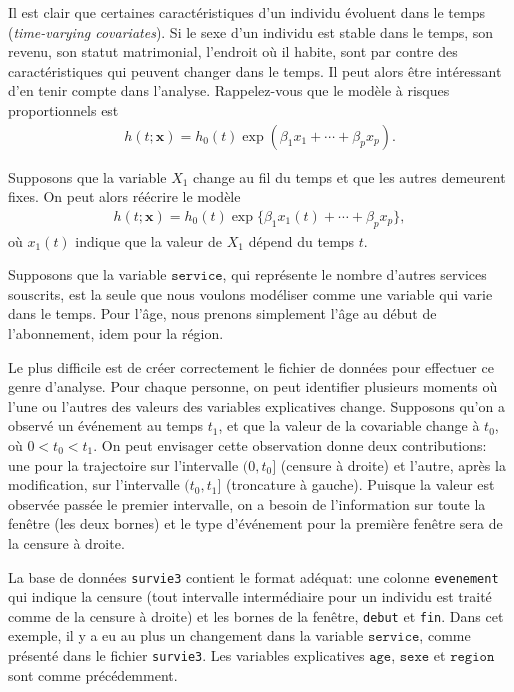 \documentclass[
  11pt,
  letterpaper,
]{book}
\theoremstyle{definition}
\theoremstyle{remark}
\begin{document}
Il est clair que certaines caractéristiques d'un individu évoluent dans
le temps (\emph{time-varying covariates}). Si le sexe d'un individu est
stable dans le temps, son revenu, son statut matrimonial, l'endroit où
il habite, sont par contre des caractéristiques qui peuvent changer dans
le temps. Il peut alors être intéressant d'en tenir compte dans
l'analyse. Rappelez-vous que le modèle à risques proportionnels est
\begin{align*}
h(t; \boldsymbol{x}) = h_0(t) \exp(\beta_1x_1 + \cdots + \beta_px_p).
\end{align*}

Supposons que la variable \(X_1\) change au fil du temps et que les
autres demeurent fixes. On peut alors réécrire le modèle \begin{align*}
h(t; \boldsymbol{x}) = h_0(t) \exp\{\beta_1x_1(t) + \cdots + \beta_px_p\},
\end{align*} où \(x_1(t)\) indique que la valeur de \(X_1\) dépend du
temps \(t\).

Supposons que la variable \(\texttt{service}\), qui représente le nombre
d'autres services souscrits, est la seule que nous voulons modéliser
comme une variable qui varie dans le temps. Pour l'âge, nous prenons
simplement l'âge au début de l'abonnement, idem pour la région.

Le plus difficile est de créer correctement le fichier de données pour
effectuer ce genre d'analyse. Pour chaque personne, on peut identifier
plusieurs moments où l'une ou l'autres des valeurs des variables
explicatives change. Supposons qu'on a observé un événement au temps
\(t_1\), et que la valeur de la covariable change à \(t_0\), où
\(0 < t_0 < t_1\). On peut envisager cette observation donne deux
contributions: une pour la trajectoire sur l'intervalle \((0, t_0]\)
(censure à droite) et l'autre, après la modification, sur l'intervalle
\((t_0, t_1]\) (troncature à gauche). Puisque la valeur est observée
passée le premier intervalle, on a besoin de l'information sur toute la
fenêtre (les deux bornes) et le type d'événement pour la première
fenêtre sera de la censure à droite.

La base de données \texttt{survie3} contient le format adéquat: une
colonne \texttt{evenement} qui indique la censure (tout intervalle
intermédiaire pour un individu est traité comme de la censure à droite)
et les bornes de la fenêtre, \texttt{debut} et \texttt{fin}. Dans cet
exemple, il y a eu au plus un changement dans la variable
\(\texttt{service}\), comme présenté dans le fichier \texttt{survie3}.
Les variables explicatives \(\texttt{age}\), \(\texttt{sexe}\) et
\(\texttt{region}\) sont comme précédemment.
\end{document}
